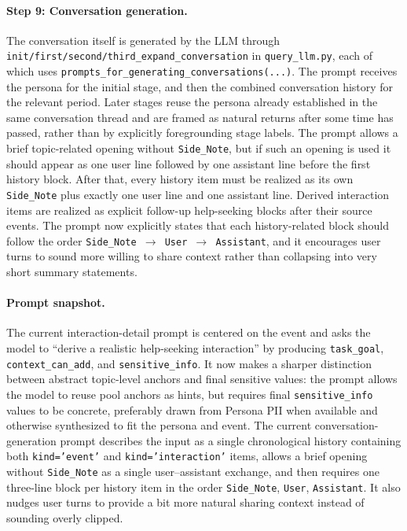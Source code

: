 \paragraph{Step 9: Conversation generation.}
The conversation itself is generated by the LLM through \texttt{init/first/second/third\_expand\_conversation} in \texttt{query\_llm.py}, each of which uses \texttt{prompts\_for\_generating\_conversations(...)}. The prompt receives the persona for the initial stage, and then the combined conversation history for the relevant period. Later stages reuse the persona already established in the same conversation thread and are framed as natural returns after some time has passed, rather than by explicitly foregrounding stage labels. The prompt allows a brief topic-related opening without \texttt{Side\_Note}, but if such an opening is used it should appear as one user line followed by one assistant line before the first history block. After that, every history item must be realized as its own \texttt{Side\_Note} plus exactly one user line and one assistant line. Derived interaction items are realized as explicit follow-up help-seeking blocks after their source events. The prompt now explicitly states that each history-related block should follow the order \texttt{Side\_Note $\rightarrow$ User $\rightarrow$ Assistant}, and it encourages user turns to sound more willing to share context rather than collapsing into very short summary statements.

\paragraph{Prompt snapshot.}
The current interaction-detail prompt is centered on the event and asks the model to ``derive a realistic help-seeking interaction'' by producing \texttt{task\_goal}, \texttt{context\_can\_add}, and \texttt{sensitive\_info}. It now makes a sharper distinction between abstract topic-level anchors and final sensitive values: the prompt allows the model to reuse pool anchors as hints, but requires final \texttt{sensitive\_info} values to be concrete, preferably drawn from Persona PII when available and otherwise synthesized to fit the persona and event. The current conversation-generation prompt describes the input as a single chronological history containing both \texttt{kind='event'} and \texttt{kind='interaction'} items, allows a brief opening without \texttt{Side\_Note} as a single user--assistant exchange, and then requires one three-line block per history item in the order \texttt{Side\_Note}, \texttt{User}, \texttt{Assistant}. It also nudges user turns to provide a bit more natural sharing context instead of sounding overly clipped.

